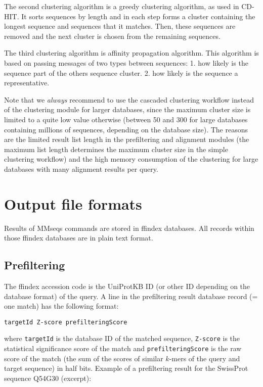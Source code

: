 \documentclass[11pt,a4paper]{report}
\begin{document}
The second clustering algorithm is a greedy clustering algorithm, as
used in CD-HIT. It sorts sequences by length and in each step forms
a cluster containing the longest sequence and sequences that it matches.
Then, these sequences are removed and the next cluster is chosen from
the remaining sequences.

The third clustering algorithm is affinity propagation algorithm. This algorithm is based on passing messages of two types between sequences: 1. how likely is the sequence part of the others sequence cluster. 2. how likely is the sequence a representative. 

Note that we \emph{always} recommend to use the cascaded clustering
workflow instead of the clustering module for larger databases, since
the maximum cluster size is limited to a quite low value otherwise
(between 50 and 300 for large databases containing millions of sequences,
depending on the database size). The reasons are the limited result
list length in the prefiltering and alignment modules (the maximum
list length determines the maximum cluster size in the simple clustering
workflow) and the high memory consumption of the clustering for large
databases with many alignment results per query.


\section{Output file formats}

Results of MMseqs commands are stored in ffindex databases. All records
within those ffindex databases are in plain text format. 


\subsection{Prefiltering}

The ffindex accession code is the UniProtKB ID (or other ID depending
on the database format) of the query. A line in the prefiltering result
database record (= one match) has the following format:

\texttt{targetId Z-score prefilteringScore}

where \texttt{targetId} is the database ID of the matched sequence,
\texttt{Z-score} is the statistical significance score of the match
and \texttt{prefilteringScore} is the raw score of the match (the
sum of the scores of similar $k$-mers of the query and target sequence)
in half bits. Example of a prefiltering result for the SwissProt sequence
Q54G30 (excerpt):
\end{document}
